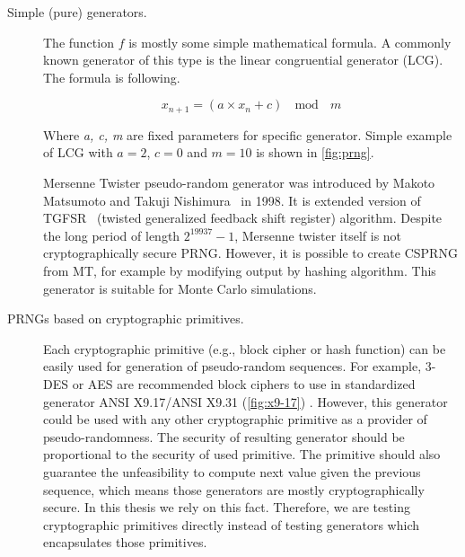 \documentclass[
    digital,    %
    oneside,    %
    color,
    11pt,
    nocover,
    notable,
    nolof,
    nolot,
    final
]{fithesis3}
\renewcommand\_{\textunderscore\allowbreak}
\begin{document}
\begin{description}
	\item[Simple (pure) generators.] The function $f$ is mostly some simple mathematical formula. A commonly known generator of this type is the linear congruential generator (LCG). The formula is following. \cite{LEcuyer07testu01}
	
	\begin{equation}
	x_{n+1} = \left( a \times x_n + c \right)~~\bmod~~m
	\label{formula:lcg}
	\end{equation}	
	
	Where \textit{a, c, m} are fixed parameters for specific generator. Simple example of LCG with $a = 2$, $c = 0$ and $m = 10$ is shown in \cref{fig:prng}. 
	
	Mersenne Twister pseudo-random generator was introduced by Makoto Matsumoto and Takuji Nishimura~\cite{Matsumoto:1998:MTE:272991.272995} in 1998. It is extended version of TGFSR~\cite{matsumoto1992twisted} (twisted generalized feedback shift register) algorithm. Despite the long period of length $2^{19937} - 1$, Mersenne twister itself is not cryptographically secure PRNG. However, it is possible to create CSPRNG from MT, for example by modifying output by hashing algorithm. This generator is suitable for Monte Carlo simulations.
	
	\item[PRNGs based on cryptographic primitives.] Each cryptographic primitive (e.g., block cipher or hash function) can be easily used for generation of pseudo-random sequences. For example, 3-DES or AES are recommended \cite{Keller05nist-recommendedrandom} block ciphers to use in standardized generator ANSI X9.17/ANSI X9.31 (\cref{fig:x9-17}) \cite{ansi1985american}. However, this generator could be used with any other cryptographic primitive as a provider of pseudo-randomness. The security of resulting generator should be proportional to the security of used primitive. The primitive should also guarantee the unfeasibility to compute next value given the previous sequence, which means those generators are mostly cryptographically secure. In this thesis we rely on this fact. Therefore, we are testing cryptographic primitives directly instead of testing generators which encapsulates those primitives.

\end{description} 
\end{document}
